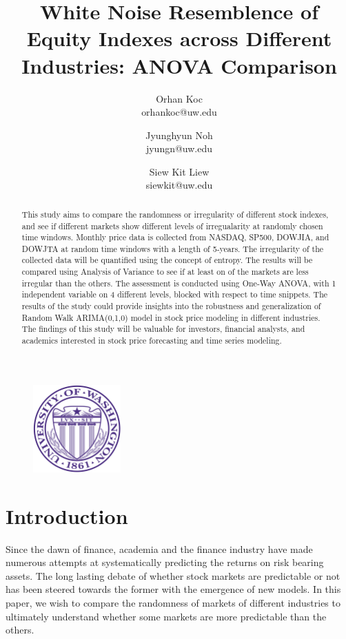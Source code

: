 \documentclass{article}[12pt]
\title{ White Noise Resemblence of Equity Indexes across Different Industries: ANOVA Comparison}
\author{ Orhan Koc \\ orhankoc@uw.edu \and
         Jyunghyun Noh \\ jyungn@uw.edu \and
         Siew Kit Liew \\ siewkit@uw.edu
    }
\begin{document}
 

    \begin{figure}
        \centering
        \includegraphics[width=0.30\textwidth]{../assets/uw.png}
    \end{figure}
    \maketitle

    \begin{abstract}
        This study aims to compare the randomness or irregularity of different stock indexes, and see if different markets show different levels of irregualarity at randomly chosen time windows. Monthly price data is collected from NASDAQ, SP500, DOWJIA, and DOWJTA at random time windows with a length of 5-years. The irregularity of the collected data will be quantified using the concept of entropy. The results will be compared using Analysis of Variance to see if at least on of the markets are less irregular than the others. The assessment is conducted using One-Way ANOVA, with 1 independent variable on 4 different levels, blocked with respect to time snippets. The results of the study could provide insights into the robustness and generalization of Random Walk ARIMA(0,1,0) model in stock price modeling in different industries. The findings of this study will be valuable for investors, financial analysts, and academics interested in stock price forecasting and time series modeling.
    \end{abstract}

    \newpage

    \section{Introduction}
        Since the dawn of finance, academia and the finance industry have made numerous attempts at systematically predicting the returns on risk bearing assets. The long lasting debate of whether stock markets are predictable or not has been steered towards the former with the emergence of new models. In this paper, we wish to compare the randomness of markets of different industries to ultimately understand whether some markets are more predictable than the others.
\end{document}
